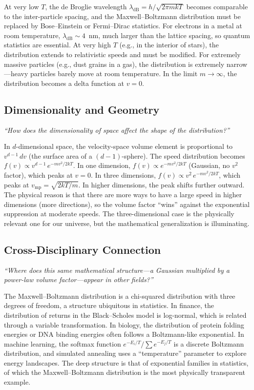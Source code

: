 \documentclass[11pt,openright]{book}
\begin{document}
At very low $T$, the de Broglie wavelength $\lambda_{\text{dB}} = h/\sqrt{2\pi mkT}$ becomes comparable to the inter-particle spacing, and the Maxwell--Boltzmann distribution must be replaced by Bose--Einstein or Fermi--Dirac statistics. For electrons in a metal at room temperature, $\lambda_{\text{dB}} \sim 4$~nm, much larger than the lattice spacing, so quantum statistics are essential. At very high $T$ (e.g., in the interior of stars), the distribution extends to relativistic speeds and must be modified. For extremely massive particles (e.g., dust grains in a gas), the distribution is extremely narrow---heavy particles barely move at room temperature. In the limit $m \to \infty$, the distribution becomes a delta function at $v = 0$.

\subsection*{Dimensionality and Geometry}
\textit{``How does the dimensionality of space affect the shape of the distribution?''}

In $d$-dimensional space, the velocity-space volume element is proportional to $v^{d-1}\,dv$ (the surface area of a $(d-1)$-sphere). The speed distribution becomes $f(v) \propto v^{d-1}\,e^{-mv^{2}/2kT}$. In one dimension, $f(v) \propto e^{-mv^{2}/2kT}$ (Gaussian, no $v^{2}$ factor), which peaks at $v = 0$. In three dimensions, $f(v) \propto v^{2}\,e^{-mv^{2}/2kT}$, which peaks at $v_{\text{mp}} = \sqrt{2kT/m}$. In higher dimensions, the peak shifts further outward. The physical reason is that there are more ways to have a large speed in higher dimensions (more directions), so the volume factor ``wins'' against the exponential suppression at moderate speeds. The three-dimensional case is the physically relevant one for our universe, but the mathematical generalization is illuminating.

\subsection*{Cross-Disciplinary Connection}
\textit{``Where does this same mathematical structure---a Gaussian multiplied by a power-law volume factor---appear in other fields?''}

The Maxwell--Boltzmann distribution is a chi-squared distribution with three degrees of freedom, a structure ubiquitous in statistics. In finance, the distribution of returns in the Black--Scholes model is log-normal, which is related through a variable transformation. In biology, the distribution of protein folding energies or DNA binding energies often follows a Boltzmann-like exponential. In machine learning, the softmax function $e^{-E_{i}/T}/\sum e^{-E_{j}/T}$ is a discrete Boltzmann distribution, and simulated annealing uses a ``temperature'' parameter to explore energy landscapes. The deep structure is that of exponential families in statistics, of which the Maxwell--Boltzmann distribution is the most physically transparent example.
\end{document}
